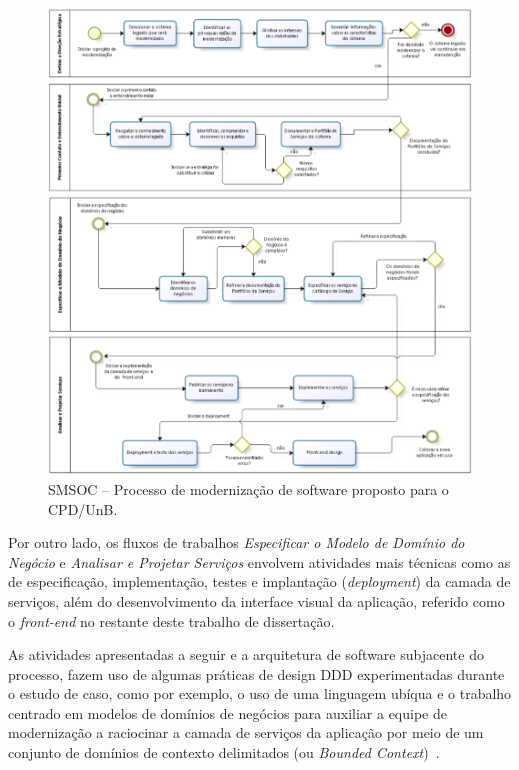 \begin{figure}[htb]
\includegraphics[scale=0.69]{img/processo/smsoc_processo.pdf}
\caption{SMSOC -- Processo de modernização de software proposto para o CPD/UnB.}
\label{fig:processo_erlangms}
\end{figure}

\FloatBarrier


Por outro lado, os fluxos de trabalhos \emph{Especificar o Modelo de Domínio do Negócio}
e \emph{Analisar e Projetar Serviços}
envolvem atividades mais técnicas como as de
especificação, implementação, testes e implantação (\textit{deployment}) 
da camada de serviços, além do desenvolvimento da interface visual da aplicação, 
referido como o \textit{front-end} no restante 
deste trabalho de dissertação. 


As atividades apresentadas a seguir e a 
arquitetura de software subjacente 
do processo,
fazem uso de algumas
práticas de design \acrshort{DDD} 
experimentadas durante o estudo de caso,
como por exemplo, o uso de uma linguagem 
ubíqua e o trabalho centrado em modelos de domínios de negócios
para auxiliar a equipe de modernização a raciocinar 
a camada de serviços da aplicação 
por meio de um conjunto de domínios de contexto
delimitados (ou \textit{Bounded Context})~\cite{evans2004domain}.

